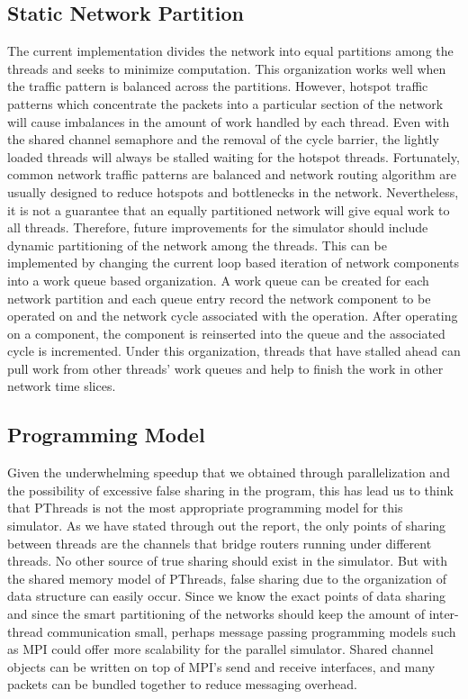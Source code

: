

\subsection{Static Network Partition}
The current implementation divides the network into equal partitions among the threads and seeks to minimize computation. This organization works well when the traffic pattern is balanced across the partitions. However, hotspot traffic patterns which concentrate the packets into a particular section of the network will cause imbalances in the amount of work handled by each thread. Even with the shared channel semaphore and the removal of the cycle barrier, the lightly loaded threads will  always be stalled waiting for the hotspot threads. Fortunately, common network traffic patterns are balanced and network routing algorithm are usually designed to reduce hotspots and bottlenecks in the network. Nevertheless, it is not a guarantee that an equally partitioned network will give equal work to all threads. Therefore, future improvements for the simulator should include dynamic partitioning of the network among the threads. This can be implemented by changing the current loop based iteration of network components into a work queue based organization. A work queue can be created for each network partition and each queue entry record the network component to be operated on and the network cycle associated with the operation. After operating on a component, the component is reinserted into the queue and the associated cycle is incremented. Under this organization, threads that have stalled ahead can pull work from other threads' work queues and help to finish the work in other network time slices.  

\subsection{Programming Model}
Given the underwhelming speedup that we obtained through parallelization and the possibility of excessive false sharing in the program, this has lead us to think that PThreads is not the most appropriate programming model for this simulator. As we have stated through out the report, the only points of sharing between threads are the channels that bridge routers running under different threads. No other source of true sharing should exist in the simulator. But with the shared memory model of PThreads, false sharing due to the organization of data structure can easily occur. Since we know the exact points of data sharing and since the smart partitioning of the networks should keep the amount of inter-thread communication small, perhaps message passing programming models such as MPI could offer more scalability for the parallel simulator. Shared channel objects can be written on top of MPI's send and receive interfaces, and many packets can be bundled together to reduce messaging overhead. 

